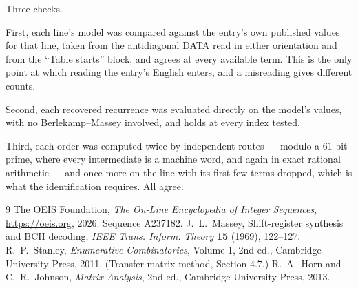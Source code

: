 \documentclass[11pt,a4paper]{article}
\theoremstyle{plain}
\theoremstyle{definition}
\begin{document}
Three checks.

First, each line's model was compared against the entry's own published values for that line,
taken from the antidiagonal DATA read in either orientation and from the ``Table starts''
block, and agrees at every available term. This is the only point at which reading the entry's
English enters, and a misreading gives different counts.

Second, each recovered recurrence was evaluated directly on the model's values, with no
Berlekamp--Massey involved, and holds at every index tested.

Third, each order was computed twice by independent routes --- modulo a $61$-bit prime, where
every intermediate is a machine word, and again in exact rational arithmetic --- and once more
on the line with its first few terms dropped, which is what the identification requires. All
agree.

\begin{thebibliography}{9}
 The OEIS Foundation, \emph{The On-Line Encyclopedia of Integer
Sequences}, \url{https://oeis.org}, 2026. Sequence A237182.
 J.~L.~Massey, Shift-register synthesis and BCH decoding, \emph{IEEE
Trans. Inform. Theory} \textbf{15} (1969), 122--127.
 R.~P.~Stanley, \emph{Enumerative Combinatorics}, Volume 1, 2nd ed.,
Cambridge University Press, 2011. (Transfer-matrix method, Section 4.7.)
 R.~A.~Horn and C.~R.~Johnson, \emph{Matrix Analysis}, 2nd ed., Cambridge
University Press, 2013.
\end{thebibliography}
\end{document}
